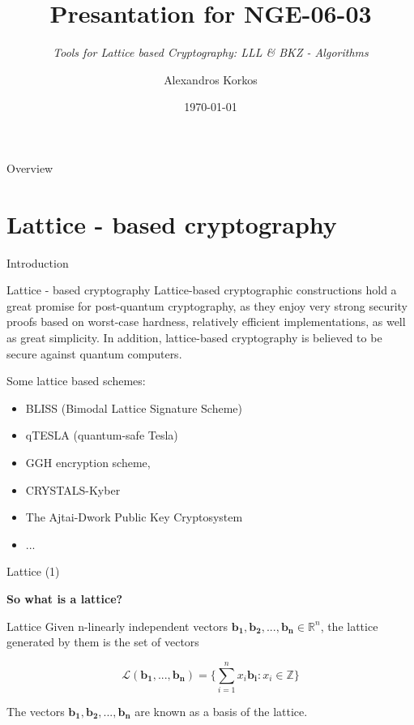 \documentclass[aspectratio=169]{beamer}
\title{Presantation for NGE-06-03}
\subtitle{\emph{Tools for Lattice based Cryptography: LLL \& BKZ - Algorithms}}
\author{Alexandros Korkos}
\institute{Aristotle University of Thessaloniki \\ Computer Science Department}
\date{\today}
\begin{document}
    \frame{\titlepage}

    

    \begin{frame}{Overview}
        \tableofcontents[currentsection, hideothersubsections, sectionstyle=show/show]
    \end{frame}

    \section{Lattice - based cryptography}

    \begin{frame}{Introduction}
        \begin{block}{Lattice - based cryptography}
            Lattice-based cryptographic constructions hold a great promise for post-quantum cryptography, as they enjoy very strong security proofs based on worst-case hardness, relatively efficient implementations, as well as great simplicity. In addition, lattice-based cryptography is believed to be secure against quantum computers.
        \end{block}

        Some lattice based schemes:

        \begin{itemize}
            \item BLISS (Bimodal Lattice Signature Scheme) 
            \item qTESLA (quantum-safe Tesla)
            \item GGH encryption scheme,
            \item CRYSTALS-Kyber
            \item The Ajtai-Dwork Public Key Cryptosystem
            \item ...
        \end{itemize}
        
    \end{frame}

    \begin{frame}{Lattice (1)}
        \begin{center}
            \textbf{So what is a lattice?}
        \end{center}

        \begin{block}{Lattice}
            Given n-linearly independent vectors $\mathbf{b_1, b_2, ..., b_n} \in \mathbb{R}^n$, the lattice generated by them is the set of vectors

            \[
                \mathcal{L}(\mathbf{b_1, ..., b_n}) = \bigg\{ \sum_{i=1}^{n} x_i\mathbf{b_i}: x_i \in \mathbb{Z} \bigg\}
            \]

            The vectors $\mathbf{b_1, b_2, ..., b_n}$ are known as a basis of the lattice.
        \end{block}
    \end{frame}
\end{document}
